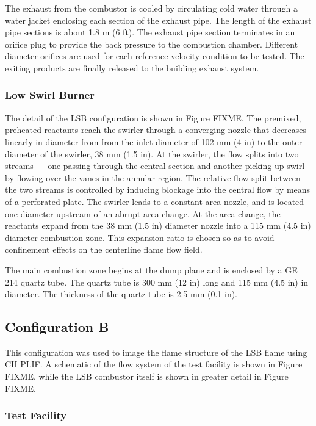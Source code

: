 The exhaust from the combustor is cooled by circulating cold water through a water jacket enclosing each section of the exhaust pipe.
The length of the exhaust pipe sections is about 1.8 m (6 ft).
The exhaust pipe section terminates in an orifice plug to provide the back pressure to the combustion chamber.
Different diameter orifices are used for each reference velocity condition to be tested.
The exiting products are finally released to the building exhaust system.

\subsubsection{Low Swirl Burner}

The detail of the LSB configuration is shown in Figure FIXME.
The premixed, preheated reactants reach the swirler through a converging nozzle that decreases linearly in diameter from from the inlet diameter of 102 mm (4 in) to the outer diameter of the swirler, 38 mm (1.5 in).
At the swirler, the flow splits into two streams --- one passing through the central section and another picking up swirl by flowing over the vanes in the annular region.
The relative flow split between the two streams is controlled by inducing blockage into the central flow by means of a perforated plate.
The swirler leads to a constant area nozzle, and is located one diameter upstream of an abrupt area change.
At the area change, the reactants expand from the 38 mm (1.5 in) diameter nozzle into a 115 mm (4.5 in) diameter combustion zone.
This expansion ratio is chosen so as to avoid confinement effects on the centerline flame flow field.\cite{1998-yegian}

The main combustion zone begins at the dump plane and is enclosed by a GE 214 quartz tube.
The quartz tube is 300 mm (12 in) long and 115 mm (4.5 in) in diameter.
The thickness of the quartz tube is 2.5 mm (0.1 in).

\subsection{Configuration B}

This configuration was used to image the flame structure of the LSB flame using CH PLIF.
A schematic of the flow system of the test facility is shown in Figure FIXME, while the LSB combustor itself is shown in greater detail in Figure FIXME.

\subsubsection{Test Facility}

